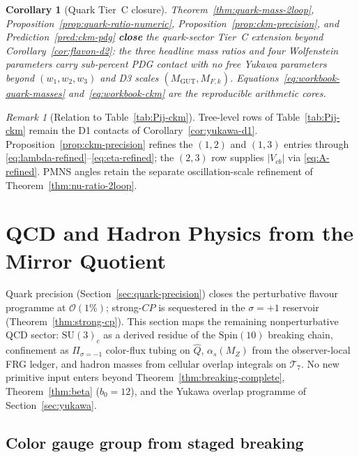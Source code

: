\documentclass[11pt]{article}
\theoremstyle{plain}
\newtheorem{corollary}[theorem]{Corollary}
\theoremstyle{definition}
\theoremstyle{remark}
\newtheorem{remark}[theorem]{Remark}
\numberwithin{equation}{section}
\newcommand{\Spin}{\mathrm{Spin}}
\begin{document}
\begin{corollary}[Quark Tier~C closure]\label{cor:quark-tier-c}
Theorem~\ref{thm:quark-mass-2loop}, Proposition~\ref{prop:quark-ratio-numeric},
Proposition~\ref{prop:ckm-precision}, and Prediction~\ref{pred:ckm-pdg}
\textbf{close} the quark-sector Tier~C extension beyond
Corollary~\ref{cor:flavon-d2}: the three headline mass ratios and four
Wolfenstein parameters carry sub-percent PDG contact with no free Yukawa
parameters beyond $(w_1,w_2,w_3)$ and D3 scales
$(M_{\mathrm{GUT}},M_{F,k})$. Equations~\eqref{eq:workbook-quark-masses}
and~\eqref{eq:workbook-ckm} are the reproducible arithmetic cores.
\end{corollary}

\begin{remark}[Relation to Table~\ref{tab:Pij-ckm}]
Tree-level rows of Table~\ref{tab:Pij-ckm} remain the D1 contacts of
Corollary~\ref{cor:yukawa-d1}. Proposition~\ref{prop:ckm-precision}
refines the $(1,2)$ and $(1,3)$ entries through
\eqref{eq:lambda-refined}--\eqref{eq:eta-refined}; the $(2,3)$ row
supplies $|V_{cb}|$ via \eqref{eq:A-refined}. PMNS angles retain the
separate oscillation-scale refinement of Theorem~\ref{thm:nu-ratio-2loop}.
\end{remark}%
\section{QCD and Hadron Physics from the Mirror Quotient}
\label{sec:qcd}

Quark precision (Section~\ref{sec:quark-precision}) closes the perturbative
flavour programme at $\mathcal{O}(1\%)$; strong-$CP$ is sequestered in the
$\sigma=+1$ reservoir (Theorem~\ref{thm:strong-cp}). This section maps the
remaining nonperturbative QCD sector: $\mathrm{SU}(3)_c$ as a derived residue
of the $\Spin(10)$ breaking chain, confinement as $\Pi_{\sigma=-1}$ color-flux
tubing on $\hat Q$, $\alpha_s(M_Z)$ from the observer-local FRG ledger, and
hadron masses from cellular overlap integrals on $\mathcal{T}_7$. No new
primitive input enters beyond Theorem~\ref{thm:breaking-complete},
Theorem~\ref{thm:beta} ($b_0=12$), and the Yukawa overlap programme of
Section~\ref{sec:yukawa}.

\subsection{Color gauge group from staged breaking}
\label{sec:qcd:derived}
\end{document}
